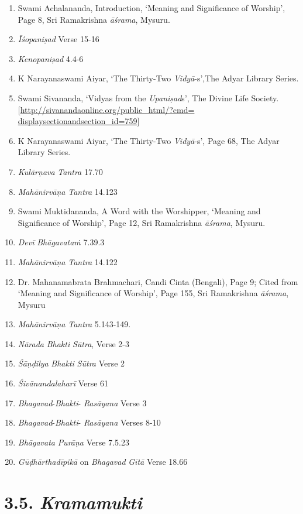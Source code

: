\begin{enumerate}
\itemsep=0pt
\item
Swami Achalananda, Introduction, `Meaning and Significance of Worship', Page 8, Sri Ramakrishna \emph{āśrama}, Mysuru.
\item
\emph{Īśopaniṣad} Verse 15-16
\item
\emph{Kenopaniṣad} 4.4-6
\item
K Narayanaswami Aiyar, `The Thirty-Two \emph{Vidyā}-s',The Adyar Library Series.
\item
Swami Sivananda, `Vidyas from the \emph{Upaniṣad}s', The Divine Life Society. [\url{http://sivanandaonline.org/public_html/?cmd=}\break
\url{displaysectionandsection_id=759}]
\item
K Narayanaswami Aiyar, `The Thirty-Two \emph{Vidyā}-s', Page 68, The Adyar Library Series.
\item
\emph{Kulārṇava} \emph{Tantra} 17.70
\item
\emph{Mahānirvāṇa} \emph{Tantra} 14.123
\item
Swami Muktidananda, A Word with the Worshipper, `Meaning and Significance of Worship', Page 12, Sri Ramakrishna \emph{āśrama}, Mysuru.
\item
\emph{Devī} \emph{Bhāgavataṁ} 7.39.3
\item
\emph{Mahānirvāṇa} \emph{Tantra} 14.122
\item
Dr. Mahanamabrata Brahmachari, Candi Cinta (Bengali), Page 9; Cited from `Meaning and Significance of Worship', Page 155, Sri Ramakrishna \emph{āśrama}, Mysuru
\item
\emph{Mahānirvāṇa} \emph{Tantra} 5.143-149.
\item
\emph{Nārada} \emph{Bhakti} \emph{Sūtra}, Verse 2-3
\item
\emph{Śāṇḍilya} \emph{Bhakti} \emph{Sūtra} Verse 2
\item
\emph{Śivānandalaharī} Verse 61
\item
\emph{Bhagavad}-\emph{Bhakti}- \emph{Rasāyana} Verse 3
\item
\emph{Bhagavad}-\emph{Bhakti}- \emph{Rasāyana} Verses 8-10
\item
\emph{Bhāgavata} \emph{Purāṇa} Verse 7.5.23
\item
\emph{Gūḍhārthadīpikā} on \emph{Bhagavad} \emph{Gītā} Verse 18.66
\end{enumerate}

\section*{3.5. \emph{Kramamukti}}

